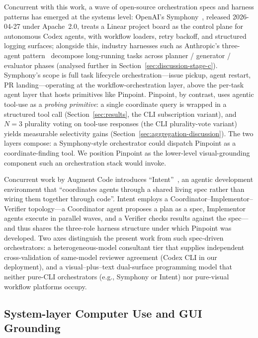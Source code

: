 \documentclass[sigconf,nonacm]{acmart}
\begin{document}
Concurrent with this work, a wave of open-source orchestration
specs and harness patterns has emerged at the systems level:
OpenAI's Symphony~\cite{openai2026symphony,openai2026symphonyrepo},
released 2026-04-27 under Apache~2.0, treats a Linear
project board as the control plane for autonomous Codex
agents, with workflow loaders, retry backoff, and structured
logging surfaces; alongside this, industry harnesses such
as Anthropic's three-agent pattern~\cite{anthropic2026threeagentharness}
decompose long-running tasks across planner / generator /
evaluator phases (analysed further in
Section~\ref{sec:discussion-stage-c}).  Symphony's scope is full
task lifecycle orchestration---issue pickup, agent restart,
PR landing---operating at the workflow-orchestration layer,
above the per-task agent layer that hosts primitives like
Pinpoint.  Pinpoint, by contrast, uses agentic tool-use as
a \emph{probing primitive}: a single coordinate query is
wrapped in a structured tool call (Section~\ref{sec:results},
the CLI subscription variant), and $N\!=\!3$ plurality voting
on tool-use responses (the CLI plurality-vote variant) yields
measurable selectivity gains
(Section~\ref{sec:aggregation-discussion}).  The two layers
compose: a Symphony-style orchestrator could dispatch
Pinpoint as a coordinate-finding tool.  We position Pinpoint
as the lower-level visual-grounding component such an
orchestration stack would invoke.

Concurrent work by Augment Code introduces
``Intent''~\cite{augmentcode2026intent}, an agentic development
environment that ``coordinates agents through a shared living
spec rather than wiring them together through code''.  Intent
employs a Coordinator--Implementor--Verifier topology---a
Coordinator agent proposes a plan as a spec, Implementor agents
execute in parallel waves, and a Verifier checks results against
the spec---and thus shares the three-role harness structure
under which Pinpoint was developed.  Two axes distinguish the
present work from such spec-driven orchestrators: a
heterogeneous-model consultant tier that supplies independent
cross-validation of same-model reviewer agreement (Codex CLI in
our deployment), and a visual--plus--text dual-surface
programming model that neither pure-CLI orchestrators (e.g.,
Symphony or Intent) nor pure-visual workflow platforms occupy.

\subsection{System-layer Computer Use and GUI Grounding}
\end{document}
